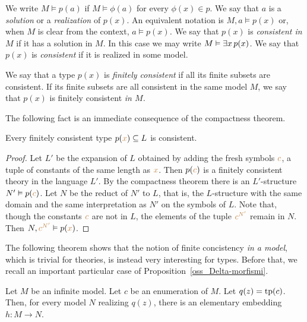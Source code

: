 We write \emph{$M\models p(a)$} if $M\models\phi(a)$ for every $\phi(x)\in p$.
We say that $a$ is a \emph{solution\/} or a \emph{realization\/} of $p(x)$.
An equivalent notation is \emph{$M,a\models p(x)$} or, when $M$ is clear from the context, \emph{$a\models p(x)$.}
We say that $p(x)$ is \emph{consistent in $M$\/} if it has a solution in $M$.
In this case we may write \emph{$M\vDash\exists x\,p(x)$.}
We say that $p(x)$ is \emph{consistent\/} if it is realized in some model.

We say that a type $p(x)$ is \emph{finitely consistent\/} if all its finite subsets are consistent.
If its finite subsets are all consistent in the same model $M$, we say that $p(x)$ is finitely consistent \emph{in $M$.}

The following fact is an immediate consequence of the compactness theorem.

\begin{fact}\label{fact_compattezzatipi}
Every finitely consistent type $p({\color{brown} x})\subseteq L$ is consistent.
\end{fact}

  \begin{proof}
  Let $L'$ be the expansion of $L$ obtained by adding the fresh symbols ${\color{brown} c}$, a tuple of constants of the same length as ${\color{brown} x}$.
  Then $p({\color{brown} c})$ is a finitely consistent theory in the language $L'$. By the compactness theorem there is an $L'$-structure $N'\vDash p({\color{brown} c})$.
  Let $N$ be the reduct of $N'$ to $L$, that is, the $L$-structure with the same domain and the same interpretation as $N'$ on the symbols of $L$.
  Note that, though the constants ${\color{brown} c}$ are not in $L$, the elements of the tuple ${\color{brown} c^{N'}}$ remain in $N$.
  Then $N,{\color{brown} c^{N'}}\vDash p({\color{brown} x})$.
\end{proof}

The following theorem shows that the notion of finite concistency \textit{in a model}, which is trivial
for theories, is instead very interesting for types.
Before that, we recall an important particular case of Proposition~\ref{oss_Delta-morfismi}. 

\begin{lemma}\label{lem_el_diag}
    Let $M$ be an infinite model.
    Let $c$ be an enumeration of $M$.
    Let $q(z)={\rm tp}(c)$.
    Then, for every model $N$ realizing $q(z)$, there is an elementary embedding $h:M\to N$. 
\end{lemma}

